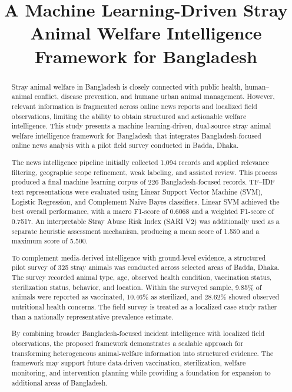 \documentclass[conference]{IEEEtran}
\begin{document}
\title{A Machine Learning-Driven Stray Animal Welfare Intelligence Framework for Bangladesh}

\author{
}

\maketitle

\begin{abstract}
Stray animal welfare in Bangladesh is closely connected with public health,
human--animal conflict, disease prevention, and humane urban animal
management. However, relevant information is fragmented across online news
reports and localized field observations, limiting the ability to obtain
structured and actionable welfare intelligence. This study presents a
machine learning-driven, dual-source stray animal welfare intelligence
framework for Bangladesh that integrates Bangladesh-focused online news
analysis with a pilot field survey conducted in Badda, Dhaka.

The news intelligence pipeline initially collected 1,094 records and applied
relevance filtering, geographic scope refinement, weak labeling, and
assisted review. This process produced a final machine learning corpus of
226 Bangladesh-focused records. TF--IDF text representations were evaluated
using Linear Support Vector Machine (SVM), Logistic Regression, and
Complement Naive Bayes classifiers. Linear SVM achieved the best overall
performance, with a macro F1-score of 0.6068 and a weighted F1-score of
0.7517. An interpretable Stray Abuse Risk Index (SARI V2) was additionally
used as a separate heuristic assessment mechanism, producing a mean score
of 1.550 and a maximum score of 5.500.

To complement media-derived intelligence with ground-level evidence, a
structured pilot survey of 325 stray animals was conducted across selected
areas of Badda, Dhaka. The survey recorded animal type, age, observed health
condition, vaccination status, sterilization status, behavior, and location.
Within the surveyed sample, 9.85\% of animals were reported as vaccinated,
10.46\% as sterilized, and 28.62\% showed observed nutritional health
concerns. The field survey is treated as a localized case study rather than
a nationally representative prevalence estimate.

By combining broader Bangladesh-focused incident intelligence with localized
field observations, the proposed framework demonstrates a scalable approach
for transforming heterogeneous animal-welfare information into structured
evidence. The framework may support future data-driven vaccination,
sterilization, welfare monitoring, and intervention planning while providing
a foundation for expansion to additional areas of Bangladesh.
\end{abstract}
\end{document}
